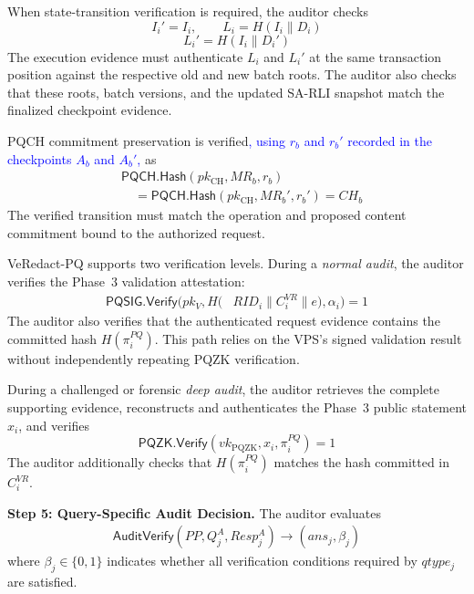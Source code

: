 \documentclass[lettersize,journal]{IEEEtran}
\begin{document}
When state-transition verification is
required, the auditor checks
\begin{equation}
I_i'=I_i,\qquad
L_i=H(I_i\parallel D_i)
\end{equation}
\begin{equation}
L_i'=H(I_i\parallel D_i')
\end{equation}
The execution evidence must authenticate
$L_i$ and $L_i'$ at the same transaction
position against the respective old
and new batch roots. The auditor also
checks that these roots, batch versions,
and the updated SA-RLI snapshot match
the finalized checkpoint evidence.

PQCH commitment preservation is verified\textcolor{blue}{, using $r_b$
and $r_b'$ recorded in the checkpoints $A_b$ and $A_b'$,}
as
\begin{equation}
\begin{aligned}
&\mathsf{PQCH.Hash}
(pk_{\mathrm{CH}},MR_b,r_b)\\
&\quad=
\mathsf{PQCH.Hash}
(pk_{\mathrm{CH}},MR_b',r_b')
=CH_b
\end{aligned}
\end{equation}
The verified transition must match the
operation and proposed content commitment
bound to the authorized request.

VeRedact-PQ supports two verification
levels. During a \emph{normal audit},
the auditor verifies the Phase~3
validation attestation:
\begin{equation}
\begin{aligned}
\mathsf{PQSIG.Verify}\big(
pk_V,
H(&RID_i\parallel C_i^{VR}\parallel e),
\alpha_i\big)=1
\end{aligned}
\end{equation}
The auditor also verifies that the
authenticated request evidence contains
the committed hash $H(\pi_i^{PQ})$.
This path relies on the VPS's signed
validation result without independently
repeating PQZK verification.

During a challenged or forensic
\emph{deep audit}, the auditor retrieves
the complete supporting evidence,
reconstructs and authenticates the
Phase~3 public statement $x_i$, and
verifies
\begin{equation}
\mathsf{PQZK.Verify}
(vk_{\mathrm{PQZK}},x_i,
\pi_i^{PQ})=1
\end{equation}
The auditor additionally checks that
$H(\pi_i^{PQ})$ matches the hash
committed in $C_i^{VR}$.

\medskip
\noindent\textbf{Step 5: Query-Specific
Audit Decision.}
The auditor evaluates
\begin{equation}
\begin{aligned}
\mathsf{AuditVerify}
(PP,Q_j^A,Resp_j^A)
\rightarrow
(ans_j,\beta_j)
\end{aligned}
\end{equation}
where $\beta_j\in\{0,1\}$ indicates
whether all verification conditions
required by $qtype_j$ are satisfied.
\end{document}
